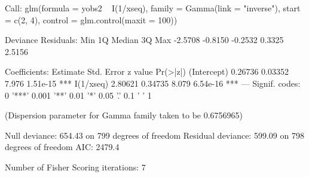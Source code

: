 \begin{Schunk}
\begin{Soutput}
Call:
glm(formula = yobs2 ~ I(1/xseq), family = Gamma(link = "inverse"), 
    start = c(2, 4), control = glm.control(maxit = 100))

Deviance Residuals: 
    Min       1Q   Median       3Q      Max  
-2.5708  -0.8150  -0.2532   0.3325   2.5156  

Coefficients:
            Estimate Std. Error z value Pr(>|z|)    
(Intercept)  0.26736    0.03352   7.976 1.51e-15 ***
I(1/xseq)    2.80621    0.34735   8.079 6.54e-16 ***
---
Signif. codes:  0 '***' 0.001 '**' 0.01 '*' 0.05 '.' 0.1 ' ' 1

(Dispersion parameter for Gamma family taken to be 0.6756965)

    Null deviance: 654.43  on 799  degrees of freedom
Residual deviance: 599.09  on 798  degrees of freedom
AIC: 2479.4

Number of Fisher Scoring iterations: 7
\end{Soutput}
\begin{Sinput}
 
\end{Sinput}
\end{Schunk}

